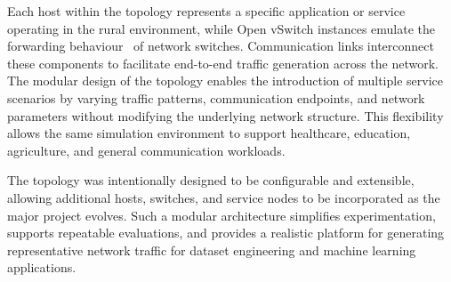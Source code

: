 \documentclass[12pt,a4paper]{report}
\begin{document}
Each host within the topology represents a specific application or service operating in the rural environment, while Open vSwitch instances emulate the forwarding behaviour~\cite{mckeown2008openflow} of network switches. Communication links interconnect these components to facilitate end-to-end traffic generation across the network. The modular design of the topology enables the introduction of multiple service scenarios by varying traffic patterns, communication endpoints, and network parameters without modifying the underlying network structure. This flexibility allows the same simulation environment to support healthcare, education, agriculture, and general communication workloads.

The topology was intentionally designed to be configurable and extensible, allowing additional hosts, switches, and service nodes to be incorporated as the major project evolves. Such a modular architecture simplifies experimentation, supports repeatable evaluations, and provides a realistic platform for generating representative network traffic for dataset engineering and machine learning applications.
\end{document}

